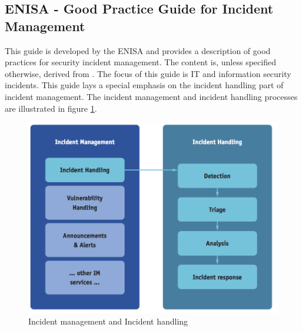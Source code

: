 \subsection{\acs{ENISA} - Good Practice Guide for Incident Management}
This guide is developed by the \ac{ENISA} and provides a description of good practices for security incident management. The content is, unless specified otherwise, derived from \cite{enisaGuide}. The focus of this guide is IT and information security incidents. This guide lays a special emphasis on the incident handling part of incident management. The incident management and incident handling processes are illustrated in figure \ref{fig:ENISAIncidentManagement}.

\begin{figure}[ht]
\begin{center}
\includegraphics[scale=0.65]{enisaIncidentManagement.png}
\caption[Incident management and Incident handling]{Incident management and Incident handling \cite{enisaGuide}}
\label{fig:ENISAIncidentManagement}
\end{center}
\end{figure}

